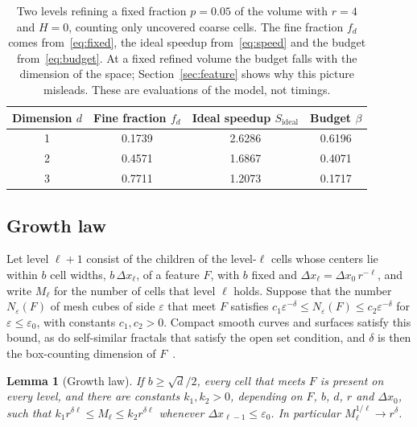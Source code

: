 \documentclass[12pt]{article}
\newtheorem{lemma}{Lemma}
\theoremstyle{remark}
\newcommand{\Sid}{S_{\mathrm{ideal}}}
\begin{document}
\begin{table}[ht]
\centering
\caption{Two levels refining a fixed fraction $p=0.05$ of the volume with $r=4$ and $H=0$, counting only uncovered coarse cells. The fine fraction $f_d$ comes from~\eqref{eq:fixed}, the ideal speedup from~\eqref{eq:speed} and the budget from~\eqref{eq:budget}. At a fixed refined volume the budget falls with the dimension of the space; Section~\ref{sec:feature} shows why this picture misleads. These are evaluations of the model, not timings.}
\label{tab:fixed}
\begin{tabular}{cccc}
\toprule
Dimension $d$ & Fine fraction $f_d$ & Ideal speedup $\Sid$ & Budget $\beta$\\
\midrule
1 & 0.1739 & 2.6286 & 0.6196\\
2 & 0.4571 & 1.6867 & 0.4071\\
3 & 0.7711 & 1.2073 & 0.1717\\
\bottomrule
\end{tabular}
\end{table}

\subsection{Growth law}\label{sec:growth}

Let level $\ell+1$ consist of the children of the level-$\ell$ cells whose centers lie within $b$ cell widths, $b\,\Delta x_\ell$, of a feature $F$, with $b$ fixed and $\Delta x_\ell=\Delta x_0\,r^{-\ell}$, and write $M_\ell$ for the number of cells that level $\ell$ holds. Suppose that the number $N_\varepsilon(F)$ of mesh cubes of side $\varepsilon$ that meet $F$ satisfies $c_1\varepsilon^{-\delta}\le N_\varepsilon(F)\le c_2\varepsilon^{-\delta}$ for $\varepsilon\le\varepsilon_0$, with constants $c_1,c_2>0$. Compact smooth curves and surfaces satisfy this bound, as do self-similar fractals that satisfy the open set condition, and $\delta$ is then the box-counting dimension of $F$~\cite{falconer2014fractal}.

\begin{lemma}[Growth law]\label{lem:growth}
If $b\ge\sqrt d/2$, every cell that meets $F$ is present on every level, and there are constants $k_1,k_2>0$, depending on $F$, $b$, $d$, $r$ and $\Delta x_0$, such that $k_1 r^{\delta\ell}\le M_\ell\le k_2 r^{\delta\ell}$ whenever $\Delta x_{\ell-1}\le\varepsilon_0$. In particular $M_\ell^{1/\ell}\to r^\delta$.
\end{lemma}
\end{document}
